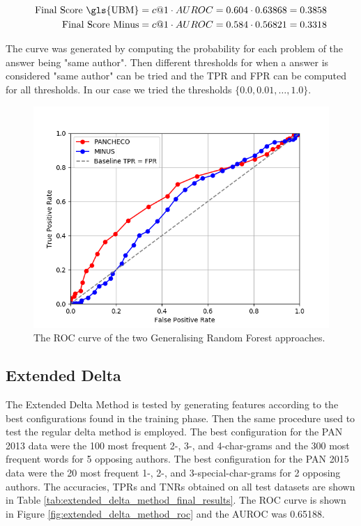 \begin{align}
    \text{Final Score \gls{UBM}} &= c@1 \cdot AUROC = 0.604 \cdot 0.63868 = 0.3858  \\
    \text{Final Score Minus} &= c@1 \cdot AUROC = 0.584 \cdot 0.56821 = 0.3318
\end{align}

The curve was generated by computing the probability for each problem of the
answer being "same author". Then different thresholds for when a answer is
considered "same author" can be tried and the \gls{TPR} and \gls{FPR} can be
computed for all thresholds. In our case we tried the thresholds $\{0.0, 0.01,
\dots, 1.0\}$.

\begin{figure}
    \centering
    \includegraphics[width=.7\textwidth]{./pictures/forest_roc.png}
    \caption{The ROC curve of the two Generalising Random Forest
    approaches.}
    \label{fig:forest_roc}
\end{figure}

\subsection{Extended Delta} \label{subsec:results:extended_delta}
The Extended Delta Method is tested by generating features according to the best
configurations found in the training phase. Then the same procedure used to
test the regular delta method is employed. The best configuration for the PAN
2013 data were the 100 most frequent 2-, 3-, and 4-char-grams and the 300 most
frequent words for 5 opposing authors. The best configuration for the PAN 2015
data were the 20 most frequent 1-, 2-, and 3-special-char-grams for 2 opposing
authors. The accuracies, \gls{TPR}s and \gls{TNR}s obtained on all test datasets
are shown in Table \ref{tab:extended_delta_method_final_results}. The \gls{ROC}
curve is shown in Figure \ref{fig:extended_delta_method_roc} and the \gls{AUROC}
was 0.65188.

